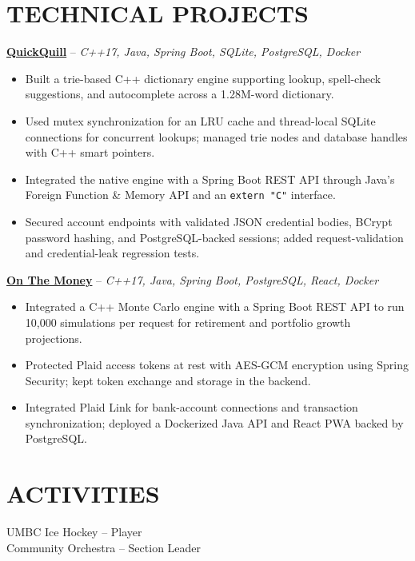 \documentclass[10pt,letterpaper]{article}
\begin{document}
\section*{TECHNICAL PROJECTS}
\textbf{\href{https://github.com/nickczak/QuickQuill-Dictionary-SpellChecker}{QuickQuill}} -- \textit{C++17, Java, Spring Boot, SQLite, PostgreSQL, Docker}
\begin{itemize}
  \item Built a trie-based C++ dictionary engine supporting lookup, spell-check suggestions, and autocomplete across a 1.28M-word dictionary.
  \item Used mutex synchronization for an LRU cache and thread-local SQLite connections for concurrent lookups; managed trie nodes and database handles with C++ smart pointers.
  \item Integrated the native engine with a Spring Boot REST API through Java's Foreign Function \& Memory API and an \texttt{extern "C"} interface.
  \item Secured account endpoints with validated JSON credential bodies, BCrypt password hashing, and PostgreSQL-backed sessions; added request-validation and credential-leak regression tests.
\end{itemize}

\textbf{\href{https://github.com/nickczak/OnTheMoney-Finance-Tracker}{On The Money}} -- \textit{C++17, Java, Spring Boot, PostgreSQL, React, Docker}
\begin{itemize}
  \item Integrated a C++ Monte Carlo engine with a Spring Boot REST API to run 10,000 simulations per request for retirement and portfolio growth projections.
  \item Protected Plaid access tokens at rest with AES-GCM encryption using Spring Security; kept token exchange and storage in the backend.
  \item Integrated Plaid Link for bank-account connections and transaction synchronization; deployed a Dockerized Java API and React PWA backed by PostgreSQL.
\end{itemize}
\section*{ACTIVITIES}
UMBC Ice Hockey -- Player \\
Community Orchestra -- Section Leader
\end{document}
